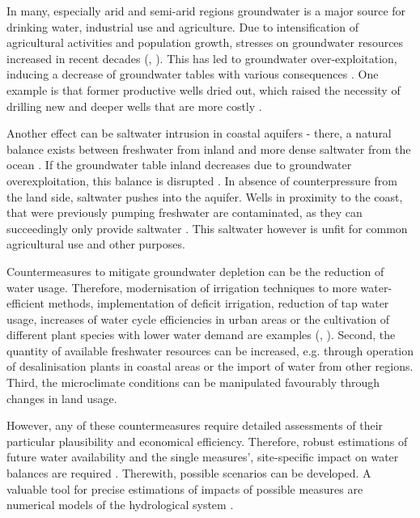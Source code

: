 In many, especially arid and semi-arid regions groundwater is a major source for drinking water, industrial use and agriculture. 
Due to intensification of agricultural activities and population growth, stresses on groundwater resources increased in recent decades (\cite{Choukr.2017}, \cite{ElRawy.2022}). 
This has led to groundwater over-exploitation, inducing a decrease of groundwater tables with various consequences \parencite{Hssaisoune.2017}. 
One example is that former productive wells dried out, which raised the necessity of drilling new and deeper wells that are more costly \parencite{English.1990}. 

Another effect can be saltwater intrusion in coastal aquifers \parencite{Fetter.2001} - there, a natural balance exists between freshwater from inland and more dense saltwater from the ocean \parencite{Mays.2005}. 
If the groundwater table inland decreases due to groundwater overexploitation, this balance is disrupted \parencite{Fetter.2001}. 
In absence of counterpressure from the land side, saltwater pushes into the aquifer. 
Wells in proximity to the coast, that were previously pumping freshwater are contaminated, as they can succeedingly only provide saltwater \parencite{Fetter.2001}. 
This saltwater however is unfit for common agricultural use \parencite{Taiz.2015} and other purposes.

Countermeasures to mitigate groundwater depletion can be the reduction of water usage. 
Therefore, modernisation of irrigation techniques to more water-efficient methods, implementation of deficit irrigation, reduction of tap water usage, increases of water cycle efficiencies in urban areas or the cultivation of different plant species with lower water demand are examples (\cite{English.1990}, \cite{Schuetze.2012}). 
Second, the quantity of available freshwater resources can be increased, e.g. through operation of desalinisation plants in coastal areas or the import of water from other regions. 
Third, the microclimate conditions can be manipulated favourably through changes in land usage.

However, any of these countermeasures require detailed assessments of their particular plausibility and economical efficiency. 
Therefore, robust estimations of future water availability and the single measures', site-specific impact on water balances are required \parencite{ElRawy.2022}. 
Therewith, possible scenarios can be developed. A valuable tool for precise estimations of impacts of possible measures are numerical models of the hydrological system \parencite{ElRawy.2022}.

